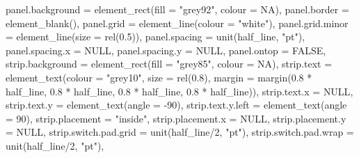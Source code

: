 \documentclass[
]{book}
\newenvironment{Shaded}{\begin{snugshade}}{\end{snugshade}}
\newcommand{\AttributeTok}[1]{\textcolor[rgb]{0.77,0.63,0.00}{#1}}
\newcommand{\ConstantTok}[1]{\textcolor[rgb]{0.00,0.00,0.00}{#1}}
\newcommand{\DecValTok}[1]{\textcolor[rgb]{0.00,0.00,0.81}{#1}}
\newcommand{\FloatTok}[1]{\textcolor[rgb]{0.00,0.00,0.81}{#1}}
\newcommand{\FunctionTok}[1]{\textcolor[rgb]{0.00,0.00,0.00}{#1}}
\newcommand{\NormalTok}[1]{#1}
\newcommand{\SpecialCharTok}[1]{\textcolor[rgb]{0.00,0.00,0.00}{#1}}
\newcommand{\StringTok}[1]{\textcolor[rgb]{0.31,0.60,0.02}{#1}}
\begin{document}
\begin{Shaded}
\begin{Highlighting}[]
               \AttributeTok{panel.background =} \FunctionTok{element\_rect}\NormalTok{(}\AttributeTok{fill =} \StringTok{"grey92"}\NormalTok{, }\AttributeTok{colour =} \ConstantTok{NA}\NormalTok{), }
               \AttributeTok{panel.border =} \FunctionTok{element\_blank}\NormalTok{(), }
               \AttributeTok{panel.grid =} \FunctionTok{element\_line}\NormalTok{(}\AttributeTok{colour =} \StringTok{"white"}\NormalTok{), }
               \AttributeTok{panel.grid.minor =} \FunctionTok{element\_line}\NormalTok{(}\AttributeTok{size =} \FunctionTok{rel}\NormalTok{(}\FloatTok{0.5}\NormalTok{)), }
               \AttributeTok{panel.spacing =} \FunctionTok{unit}\NormalTok{(half\_line, }\StringTok{"pt"}\NormalTok{), }
               \AttributeTok{panel.spacing.x =} \ConstantTok{NULL}\NormalTok{, }
               \AttributeTok{panel.spacing.y =} \ConstantTok{NULL}\NormalTok{, }
               \AttributeTok{panel.ontop =} \ConstantTok{FALSE}\NormalTok{, }
               \AttributeTok{strip.background =} \FunctionTok{element\_rect}\NormalTok{(}\AttributeTok{fill =} \StringTok{"grey85"}\NormalTok{, }\AttributeTok{colour =} \ConstantTok{NA}\NormalTok{), }
               \AttributeTok{strip.text =} \FunctionTok{element\_text}\NormalTok{(}\AttributeTok{colour =} \StringTok{"grey10"}\NormalTok{, }\AttributeTok{size =} \FunctionTok{rel}\NormalTok{(}\FloatTok{0.8}\NormalTok{), }
                                         \AttributeTok{margin =} \FunctionTok{margin}\NormalTok{(}\FloatTok{0.8} \SpecialCharTok{*}\NormalTok{ half\_line, }\FloatTok{0.8} \SpecialCharTok{*}\NormalTok{ half\_line, }\FloatTok{0.8} \SpecialCharTok{*}\NormalTok{ half\_line, }\FloatTok{0.8} \SpecialCharTok{*}\NormalTok{ half\_line)), }
               \AttributeTok{strip.text.x =} \ConstantTok{NULL}\NormalTok{, }\AttributeTok{strip.text.y =} \FunctionTok{element\_text}\NormalTok{(}\AttributeTok{angle =} \SpecialCharTok{{-}}\DecValTok{90}\NormalTok{), }
               \AttributeTok{strip.text.y.left =} \FunctionTok{element\_text}\NormalTok{(}\AttributeTok{angle =} \DecValTok{90}\NormalTok{), }
               \AttributeTok{strip.placement =} \StringTok{"inside"}\NormalTok{, }
               \AttributeTok{strip.placement.x =} \ConstantTok{NULL}\NormalTok{, }
               \AttributeTok{strip.placement.y =} \ConstantTok{NULL}\NormalTok{, }
               \AttributeTok{strip.switch.pad.grid =} \FunctionTok{unit}\NormalTok{(half\_line}\SpecialCharTok{/}\DecValTok{2}\NormalTok{, }\StringTok{"pt"}\NormalTok{), }
               \AttributeTok{strip.switch.pad.wrap =} \FunctionTok{unit}\NormalTok{(half\_line}\SpecialCharTok{/}\DecValTok{2}\NormalTok{, }\StringTok{"pt"}\NormalTok{), }

\end{Highlighting}
\end{Shaded}
\end{document}
